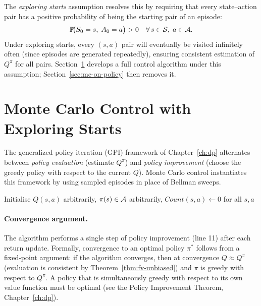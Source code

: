 The \emph{exploring starts} assumption resolves this by requiring that every state--action pair has a positive probability of being the starting pair of an episode:
\[
  \mathbb{P}\!\bigl(S_0 = s,\; A_0 = a\bigr) > 0 \quad \forall\, s \in \mathcal{S},\; a \in \mathcal{A}.
\]
Under exploring starts, every $(s, a)$ pair will eventually be visited infinitely often (since episodes are generated repeatedly), ensuring consistent estimation of $Q^\pi$ for all pairs.  Section~\ref{sec:mc-es} develops a full control algorithm under this assumption; Section~\ref{sec:mc-on-policy} then removes it.


\section{Monte Carlo Control with Exploring Starts}
\label{sec:mc-es}

The generalized policy iteration (GPI) framework of Chapter~\ref{ch:dp} alternates between \emph{policy evaluation} (estimate $Q^\pi$) and \emph{policy improvement} (choose the greedy policy with respect to the current $Q$).  Monte Carlo control instantiates this framework by using sampled episodes in place of Bellman sweeps.

\begin{algorithm}[ht]
\caption{Monte Carlo Control with Exploring Starts (MC-ES)}
\label{alg:mc-es}
Initialise $Q(s,a)$ arbitrarily, $\pi(s) \in \mathcal{A}$ arbitrarily, $\mathit{Count}(s,a) \leftarrow 0$ for all $s, a$\;
\end{algorithm}

\paragraph{Convergence argument.}
The algorithm performs a single step of policy improvement (line 11) after each return update.  Formally, convergence to an optimal policy $\pi^*$ follows from a fixed-point argument: if the algorithm converges, then at convergence $Q \approx Q^{\pi}$ (evaluation is consistent by Theorem~\ref{thm:fv-unbiased}) and $\pi$ is greedy with respect to $Q^{\pi}$.  A policy that is simultaneously greedy with respect to its own value function must be optimal (see the Policy Improvement Theorem, Chapter~\ref{ch:dp}).

